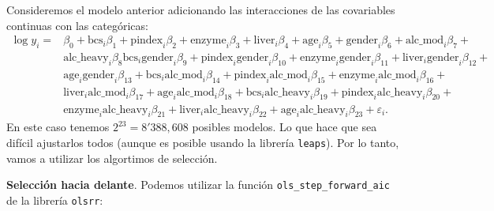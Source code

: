 \documentclass[
]{article}
\begin{document}
Consideremos el modelo anterior adicionando las interacciones de las covariables continuas con las categóricas:
\begin{equation}
\begin{split}
\log y_{i} =& \beta_{0}+\mbox{bcs}_{i}\beta_{1} + \mbox{pindex}_{i}\beta_{2}+ \mbox{enzyme}_{i}\beta_{3} +  \mbox{liver}_{i}\beta_{4} + \mbox{age}_{i}\beta_{5} +  \mbox{gender}_{i}\beta_{6}+ \mbox{alc_mod}_{i}\beta_{7} + \\ &  \mbox{alc_heavy}_{i}\beta_{8} \mbox{bcs}_{i}\mbox{gender}_{i}\beta_{9} + \mbox{pindex}_{i}\mbox{gender}_{i}\beta_{10} + \mbox{enzyme}_{i}\mbox{gender}_{i}\beta_{11} + \mbox{liver}_{i}\mbox{gender}_{i}\beta_{12}  + \\ & \mbox{age}_{i}\mbox{gender}_{i}\beta_{13} + \mbox{bcs}_{i}\mbox{alc_mod}_{i}\beta_{14} + \mbox{pindex}_{i}\mbox{alc_mod}_{i}\beta_{15} + \mbox{enzyme}_{i}\mbox{alc_mod}_{i}\beta_{16} +  \\ & \mbox{liver}_{i}\mbox{alc_mod}_{i}\beta_{17} + \mbox{age}_{i}\mbox{alc_mod}_{i}\beta_{18} + \mbox{bcs}_{i}\mbox{alc_heavy}_{i}\beta_{19} + \mbox{pindex}_{i}\mbox{alc_heavy}_{i}\beta_{20} + \\ & \mbox{enzyme}_{i}\mbox{alc_heavy}_{i}\beta_{21} + \mbox{liver}_{i}\mbox{alc_heavy}_{i}\beta_{22} + \mbox{age}_{i}\mbox{alc_heavy}_{i}\beta_{23} + \varepsilon_{i}.
\end{split}
\nonumber
\end{equation}
En este caso tenemos \(2^{23}=8'388,608\) posibles modelos. Lo que hace que sea difícil ajustarlos todos (aunque es posible usando la librería \texttt{leaps}). Por lo tanto, vamos a utilizar los algortimos de selección.

\textbf{Selección hacia delante}. Podemos utilizar la función \texttt{ols\_step\_forward\_aic} de la librería \texttt{olsrr}:
\end{document}
